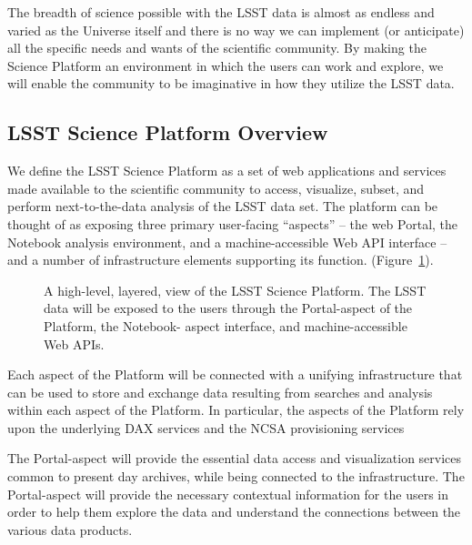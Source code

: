 \documentclass[DM,lsstdraft,toc]{lsstdoc}
\begin{document}
The breadth of science possible with the LSST data is almost as endless and 
varied as the Universe itself and there is no way we can implement (or 
anticipate) all the specific needs and wants of the scientific community.  By 
making the Science Platform an environment in which the users can work and 
explore, we will enable the community to be imaginative in how they utilize the 
LSST data.

\subsection{LSST Science Platform Overview}

We define the LSST Science Platform as a set of web applications and services 
made available to the scientific community to access, visualize, subset, and 
perform next-to-the-data analysis of the LSST data set.  The platform can be 
thought of as exposing three primary user-facing ``aspects'' -- the web Portal, 
the Notebook analysis environment, and a machine-accessible Web API interface -- 
and a number of infrastructure elements supporting its function.  
(Figure~\ref{fig:layeredLSP}). 
\begin{figure}
\centering
{}
\caption{
A high-level, layered, view of the LSST Science Platform.  The LSST data will be 
exposed to the users through the Portal-aspect of the Platform, the Notebook- 
aspect interface, and machine-accessible Web APIs. 
\label{fig:layeredLSP}}
\end{figure}

Each aspect of the Platform will be connected with a unifying infrastructure 
that can be used to store and exchange data resulting from searches and analysis 
within each aspect of the Platform.  In particular, the aspects of the Platform 
rely upon the underlying DAX services and the NCSA provisioning services

The Portal-aspect will provide the essential data access and visualization 
services common to present day archives, while being connected to the 
infrastructure.  The Portal-aspect will provide the necessary contextual 
information for the users in order to help them explore the data and understand 
the connections between the various data products. 
\end{document}
